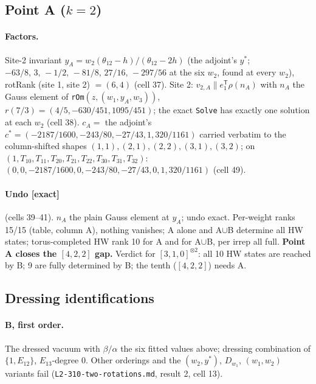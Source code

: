 \documentclass[11pt]{article}
\newcommand{\eT}{e_1^{\mathsf T}}
\newcommand{\Tt}[1]{T_{#1}}
\newcommand{\thh}{\theta_{12}}
\newcommand{\ex}{\textbf{[exact]}}
\newcommand{\nb}[1]{\texttt{#1}}
\begin{document}
\subsection{Point A ($k=2$)}

\paragraph{Factors.} Site-2 invariant $y_A=w_2(\thh-h)/(\thh-2h)$ (the adjoint's $y^*$; $-63/8,\,3,\,-1/2,\,-81/8,\,27/16,\,-297/56$ at the six $w_2$, found at every $w_2$), rotRank (site 1, site 2) $=(6,4)$ (cell 37). Site 2: $v_{2,A}\parallel\eT\rho(n_A)$ with $n_A$ the Gauss element of \nb{rOm}$(z,(w_1,y_A,w_3))$, $r(7/3)=(4/5,-630/451,1095/451)$; the exact \texttt{Solve} has exactly one solution at each $w_2$ (cell 38). $c_A=$ the adjoint's $c^*=(-2187/1600,-243/80,-27/43,1,320/1161)$ carried verbatim to the column-shifted shapes $(1,1),(2,1),(2,2),(3,1),(3,2)$; on $(1,\Tt{10},\Tt{11},\Tt{20},\Tt{21},\Tt{22},\Tt{30},\Tt{31},\Tt{32})$: $(0,0,-2187/1600,0,-243/80,-27/43,0,1,320/1161)$ (cell 49).

\paragraph{Undo \ex} (cells 39--41). $n_A$ the plain Gauss element at $y_A$; undo exact. Per-weight ranks 15/15 (table, column A), nothing vanishes; A alone and A$\cup$B determine all HW states; torus-completed HW rank 10 for A and for A$\cup$B, per irrep all full. \textbf{Point A closes the $[4,2,2]$ gap.} Verdict for $[3,1,0]^{\otimes2}$: all 10 HW states are reached by B; 9 are fully determined by B; the tenth ($[4,2,2]$) needs A.

\subsection{Dressing identifications}

\paragraph{B, first order.} The dressed vacuum with $\beta/\alpha$ the six fitted values above; dressing combination of $\{1,E_{12}\}$, $E_{13}$-degree 0. Other orderings and the $(w_2,y^*)$, $D_{w_1}$, $(w_1,w_2)$ variants fail (\nb{L2-310-two-rotations.md}, result 2, cell 13).
\end{document}
